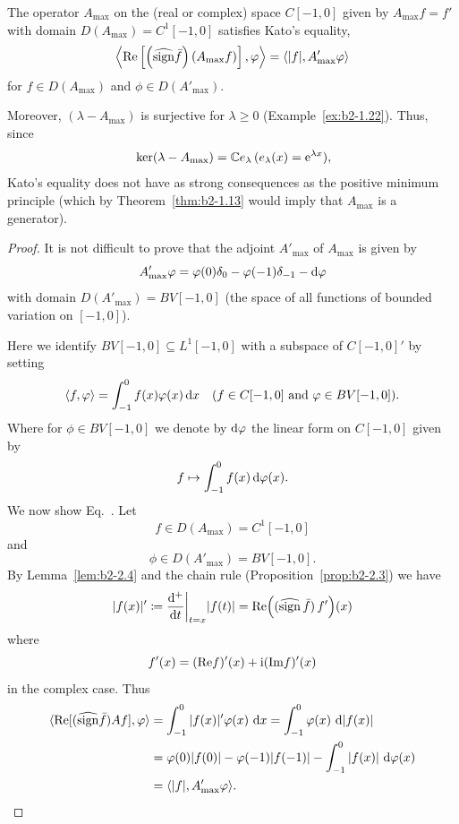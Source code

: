\begin{example}\label{ex:b2-2.12}
The operator $A_{\max}$ on the (real or complex) space $C[-1,0]$ given by $A_{\max}f = f'$ with domain $D(A_{\max}) = C^{1}[-1,0]$ satisfies Kato's equality, \ie 
\begin{equation}\label{eq:b2-2.16}
\left\langle \Re\left[\left(\widehat{\sign} \bar{f}\right)(A_{\max}f)\right],\phi \right\rangle = \langle |f|,A'_{\max}\phi \rangle
\end{equation}
for $f \in D(A_{\max})$ and $\phi \in D(A'_{\max})$.

Moreover, $(\lambda - A_{\max})$ is surjective for $\lambda \geq 0$ (\cf Example~\ref{ex:b2-1.22}).
Thus, since 
\[
	\mathop{}\mathrm{ker}(\lambda - A_{\max}) = \mathbb{C} e_{\lambda} \, (e_{\lambda}(x) = \mathrm{e}^{\lambda x}), 
\]
Kato's equality does not have as strong consequences as the positive minimum principle (which by Theorem~\ref{thm:b2-1.13} would imply that $A_{\max}$ is a generator).
\end{example}
\begin{proof}
It is not difficult to prove that the adjoint $A'_{\max}$ of\/ $A_{\max}$ is given by
\begin{equation}\label{eq:b2-2.17}
A'_{\max}\phi = \phi(0)\delta_{0} - \phi(-1)\delta_{-1} - \diff{\phi}
\end{equation}
with domain $D(A'_{\max}) = BV[-1,0]$ (the space of all functions of bounded variation on $[-1,0]$).

Here we identify $BV[-1,0] \subseteq L^{1}[-1,0]$ with a subspace of\/ $C[-1,0]'$ by setting 
%
\[
	\langle f,\phi \rangle = \int_{-1}^{0} f(x) \phi(x) \dx 
	\quad (f \in C[-1,0] \text{ and } \phi \in BV[-1,0]) .
\]
%
Where for $\phi \in BV[-1,0]$ we denote by $\diff{\phi}$ the linear form on $C[-1,0]$ given by 
%
\[
	f \mapsto \int_{-1}^{0} f(x)  \diff{\phi(x)} .
\]
%
We now show Eq.~.
Let 
%
\[
	f \in D(A_{\max}) = C^{1}[-1,0] 
\]
%
and 
%
\[
	\phi \in D(A'_{\max}) =  BV[-1,0] .
\]
%
By Lemma~\ref{lem:b2-2.4} and the chain rule (Proposition~\ref{prop:b2-2.3}) we have
\[
|f(x)|' \coloneq \frac{\diff{^{+}}}{\dt}\bigg|_{t=x} |f(t)| 
= \Re \mleft( ( \widehat{\sign}\, \bar{f} ) \, f' \mright)(x)
\]
where
%
\[
	  f'(x) = (\mathop{}\!\mathrm{Re} f)'(x) + \mathrm{i} (\mathop{}\!\mathrm{Im} f)'(x)  
\]
%
in the complex case.
Thus
\begin{align*}
\langle \Re[(\widehat{\sign} \bar{f})Af],\phi \rangle &= \int_{-1}^{0} |f(x)|'\phi(x)\, \dx = \int_{-1}^{0} \phi(x)\, \diff{|f(x)|} \\
&= \phi(0)|f(0)| - \phi(-1)|f(-1)| - \int_{-1}^{0} |f(x)|\,\diff{\phi(x)}  \\
&= \langle |f|,A'_{\max}\phi \rangle.
\tag*{\qedsymbol}%
\end{align*}
\let\qedsymbol\relax
\end{proof}
